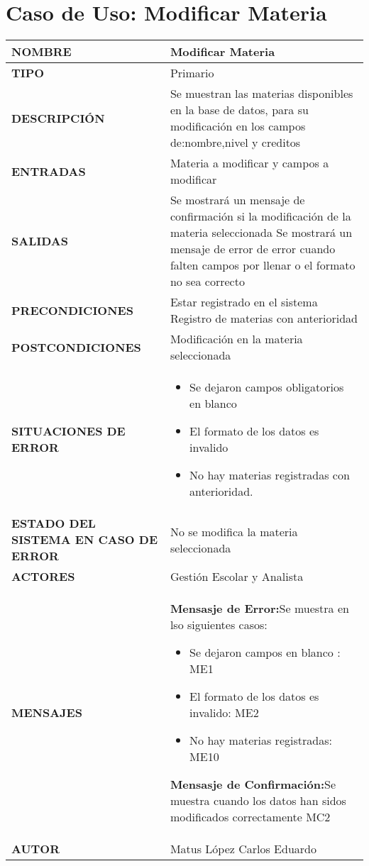 \newpage
\section{Caso de Uso: Modificar Materia}
\begin{longtable}{ | p{6cm} | p{10cm} |}
\hline
\textbf{NOMBRE} & Modificar Materia\\
\hline
\textbf{TIPO} & Primario\\
\hline
\textbf{DESCRIPCIÓN} & Se muestran las materias disponibles en la base de datos, para su modificación en los campos de:nombre,nivel y creditos\\
\hline
\textbf{ENTRADAS} & Materia a modificar y campos a modificar\\
\hline
\textbf{SALIDAS} & Se mostrará un mensaje de confirmación si la modificación de la materia seleccionada
Se mostrará un mensaje de error de error cuando falten campos por llenar o el formato no sea correcto\\
\hline
\textbf{PRECONDICIONES} & Estar registrado en el sistema
Registro de materias con anterioridad\\
\hline
\textbf{POSTCONDICIONES} & Modificación en la materia seleccionada\\
\hline
\textbf{SITUACIONES DE ERROR} & \begin{itemize}
    \item Se dejaron campos obligatorios en blanco
    \item El formato de los datos es invalido
    \item No hay materias registradas con anterioridad.
\end{itemize}
\\
\hline
\textbf{ESTADO DEL SISTEMA EN CASO DE ERROR} & No se modifica la materia seleccionada\\
\hline
\textbf{ACTORES} & Gestión Escolar y Analista\\
\hline
\textbf{MENSAJES} & \textbf{Mensasje de Error:}Se muestra en lso siguientes casos: \begin{itemize}
    \item Se dejaron campos en blanco : ME1
    \item El formato de los datos es invalido: ME2
    \item No hay materias registradas: ME10
\end{itemize} 
\textbf{Mensasje de Confirmación:}Se muestra cuando los datos han sidos modificados correctamente MC2
\\
\hline
\textbf{AUTOR} & Matus López Carlos Eduardo\\
\hline
\end{longtable}
